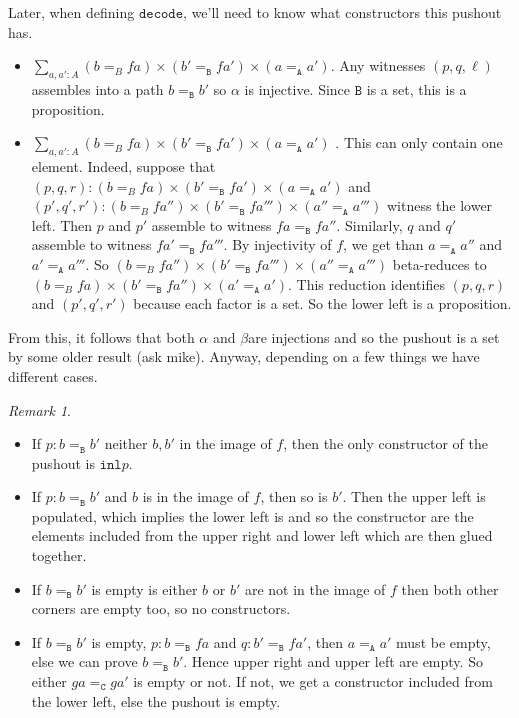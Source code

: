 \documentclass[12pt]{amsart}
\newcommand{\type}[1]{\mathtt{#1}}
\newcommand{\A}{\type{A}}
\newcommand{\B}{\type{B}}
\newcommand{\C}{\type{C}}
\newcommand{\inl}{\type{inl}}
\newcommand{\decode}{\type{decode}}
\theoremstyle{remark}
\newtheorem{rmk}{Remark}
\theoremstyle{definition}
\begin{document}
Later, when defining $ \decode $, we'll need to know what constructors this pushout has.  
\begin{itemize}
	\item $  \sum_{ a , a' : A } ( b =_B f  a ) \times ( b' =_{\B} f  a' ) \times ( a =_{\A} a' ) $.  Any witnesses $ (p,q,\ell) $ assembles into a path $ b =_{\B} b' $ so $ \alpha $ is injective.  Since $ \B $ is a set, this is a proposition.
	\item $  \sum_{ a , a' : A } ( b =_B f  a ) \times ( b' =_{\B} f  a' ) \times ( a =_{\A} a' ) $ .  This can only contain one element.  Indeed, suppose that $ (p,q,r) : ( b =_B f  a ) \times ( b' =_{\B} f  a' ) \times ( a =_{\A} a' ) $ and $ (p',q',r') : ( b =_B f  a'' ) \times ( b' =_{\B} f  a''' ) \times ( a'' =_{\A} a''' ) $ witness the lower left.  Then $ p $ and $ p' $ assemble to witness $ fa =_{\B} fa'' $. Similarly, $ q $ and $ q' $ assemble to witness $ fa' =_{\B} fa''' $. By injectivity of $ f $, we get than $ a =_{\A} a'' $ and $ a' =_{\A} a''' $.  So $ ( b =_B f  a'' ) \times ( b' =_{\B} f  a''' ) \times ( a'' =_{\A} a''' ) $ beta-reduces to $ ( b =_B f  a ) \times ( b' =_{\B} f  a'' ) \times ( a' =_{\A} a' ) $. This reduction identifies $ (p,q,r) $ and $ (p',q',r') $ because each factor is a set.  So the lower left is a proposition.
\end{itemize}

From this, it follows that both $ \alpha $ and $ \beta $are injections and so the pushout is a set by some older result (ask mike).  Anyway, depending on a few things we have different cases.
\begin{rmk} \label{rmk_code-bb-cases}
\begin{itemize}
	\item If $ p : b =_{\B} b' $ neither $ b,b' $ in the image of $ f $, then the only constructor of the pushout is $ \inl p $.
	\item If $ p : b =_{\B} b' $ and $ b $ is in the image of $ f $, then so is $ b' $.  Then the upper left is populated, which implies the lower left is and so the constructor are the elements included from the upper right and lower left which are then glued together.
	\item If $ b =_{\B} b' $ is empty is either $ b $ or $ b' $ are not in the image of $ f $ then both other corners are empty too, so no constructors.
	\item If $ b =_{\B} b' $ is empty, $ p: b =_{\B} fa $ and $ q : b' =_{\B} fa' $, then $ a =_{\A} a' $ must be empty, else we can prove $ b=_{\B}b' $. Hence upper right and upper left are empty.  So either $ ga =_{\C} ga' $ is empty or not.  If not, we get a constructor included from the lower left, else the pushout is empty.  
\end{itemize}
\end{rmk}
\end{document}
